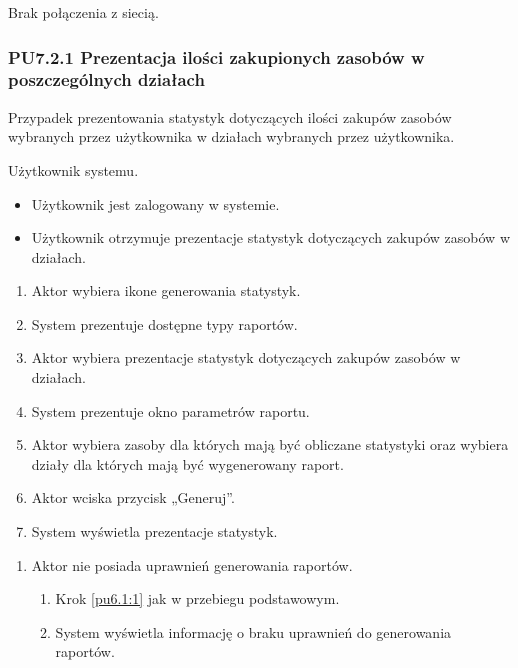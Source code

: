 Brak połączenia z siecią.

\subsubsection{PU7.2.1 Prezentacja ilości zakupionych zasobów w poszczególnych działach}
Przypadek prezentowania statystyk dotyczących ilości zakupów zasobów wybranych przez użytkownika w działach wybranych przez użytkownika.

Użytkownik systemu.

\begin{itemize}
\item Użytkownik jest zalogowany w systemie.
\end{itemize}

\begin{itemize}
\item Użytkownik otrzymuje prezentacje statystyk dotyczących zakupów zasobów w działach.
\end{itemize}

\begin{enumerate}
	\item \label{pu7.2.1:1} Aktor wybiera ikone generowania statystyk.
	\item System prezentuje dostępne typy raportów.
	\item \label{pu7.2.1:2} Aktor wybiera prezentacje statystyk dotyczących zakupów zasobów w działach.
	\item System prezentuje okno parametrów raportu.
	\item Aktor wybiera zasoby dla których mają być obliczane statystyki oraz wybiera działy dla których mają być wygenerowany raport.
	\item Aktor wciska przycisk „Generuj”.
	\item System wyświetla prezentacje statystyk.
\end{enumerate}

\begin{enumerate}
	\item Aktor nie posiada uprawnień generowania raportów.
	\begin{enumerate}[label*=\arabic*.]
		\item Krok \ref{pu6.1:1} jak w przebiegu podstawowym.
		\item System wyświetla informację o braku uprawnień do generowania raportów.
	\end{enumerate}
\end{enumerate}

